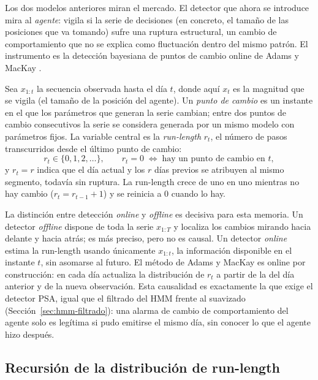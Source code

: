 Los dos modelos anteriores miran el mercado. El detector que ahora se introduce mira al \emph{agente}: vigila si la serie de decisiones (en concreto, el tamaño de las posiciones que va tomando) sufre una ruptura estructural, un cambio de comportamiento que no se explica como fluctuación dentro del mismo patrón. El instrumento es la detección bayesiana de puntos de cambio online de Adams y MacKay \cite{adams2007}.

Sea $x_{1:t}$ la secuencia observada hasta el día $t$, donde aquí $x_t$ es la magnitud que se vigila (el tamaño de la posición del agente). Un \emph{punto de cambio} es un instante en el que los parámetros que generan la serie cambian; entre dos puntos de cambio consecutivos la serie se considera generada por un mismo modelo con parámetros fijos. La variable central es la \emph{run-length} $r_t$, el número de pasos transcurridos desde el último punto de cambio:
\[
r_t \in \{0, 1, 2, \dots\}, \qquad
r_t = 0 \;\Leftrightarrow\; \text{hay un punto de cambio en } t,
\]
y $r_t = r$ indica que el día actual y los $r$ días previos se atribuyen al mismo segmento, todavía sin ruptura. La run-length crece de uno en uno mientras no hay cambio ($r_t = r_{t-1} + 1$) y se reinicia a $0$ cuando lo hay.

La distinción entre detección \emph{online} y \emph{offline} es decisiva para esta memoria. Un detector \emph{offline} dispone de toda la serie $x_{1:T}$ y localiza los cambios mirando hacia delante y hacia atrás; es más preciso, pero no es causal. Un detector \emph{online} estima la run-length usando únicamente $x_{1:t}$, la información disponible en el instante $t$, sin asomarse al futuro. El método de Adams y MacKay es online por construcción: en cada día actualiza la distribución de $r_t$ a partir de la del día anterior y de la nueva observación. Esta causalidad es exactamente la que exige el detector PSA, igual que el filtrado del HMM frente al suavizado (Sección~\ref{sec:hmm-filtrado}): una alarma de cambio de comportamiento del agente solo es legítima si pudo emitirse el mismo día, sin conocer lo que el agente hizo después.

\subsection{Recursión de la distribución de run-length}
\label{sec:bocpd-recursion}

